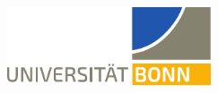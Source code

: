 \begin{titlepage}

	\begin{addmargin}[-2cm]{-2.5cm}
    \begin{center}
        \large
        
		\begin{flushleft}
		\includegraphics[width=6cm]{gfx/logos/unilogobonn}
		\end{flushleft}
       
        \vfill

        \begingroup
            \color{Blue}\spacedallcaps{\myTitle} \bigskip
        \endgroup


        \vfill

        \medskip

        \myDegree \\ \medskip
        \myTime

        \bigskip

        \vfill

	\myUni \\
        \myDepartment \\
        \myFaculty \\


    \end{center}
  \end{addmargin}
\end{titlepage}   